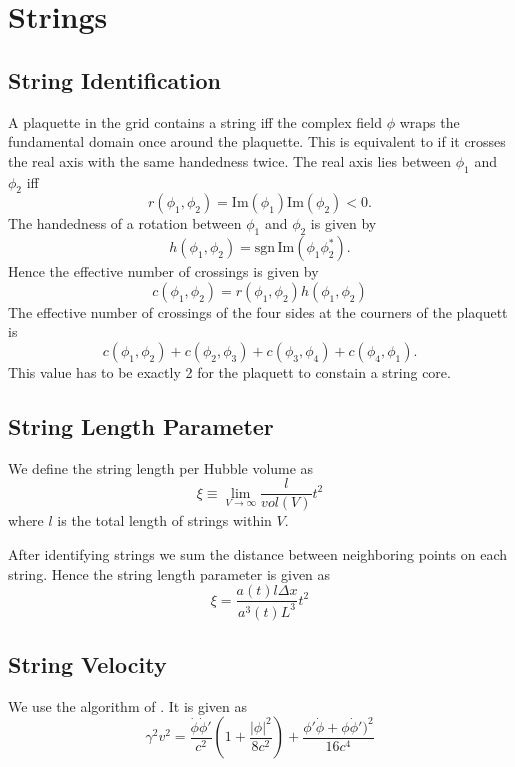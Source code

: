\documentclass[a4paper]{article}
\begin{document}
\newpage
\section{Strings}

\subsection{String Identification}
A plaquette in the grid contains a string iff the complex field $\phi$ wraps the fundamental domain once around the plaquette.
This is equivalent to if it crosses the real axis with the same handedness twice.
The real axis lies between $\phi_1$ and $\phi_2$ iff
\begin{equation}
	r(\phi_1, \phi_2) = \mathrm{Im}(\phi_1) \mathrm{Im}(\phi_2) < 0.
\end{equation} 
The handedness of a rotation between $\phi_1$ and $\phi_2$ is given by
\begin{equation}
	h(\phi_1, \phi_2) = \mathrm{sgn} \, \mathrm{Im} (\phi_1 \phi_2^*).
\end{equation}
Hence the effective number of crossings is given by
\begin{equation}
	c(\phi_1, \phi_2) = r(\phi_1, \phi_2) h(\phi_1, \phi_2)
\end{equation}
The effective number of crossings of the four sides at the courners of the plaquett is
\begin{equation}
	c(\phi_1, \phi_2) + c(\phi_2, \phi_3) + c(\phi_3, \phi_4) + c(\phi_4, \phi_1).
\end{equation}
This value has to be exactly 2 for the plaquett to constain a string core.

\subsection{String Length Parameter}
We define the string length per Hubble volume as
\begin{equation}
    \xi \equiv \lim_{V \to \infty} \frac{l}{vol(V)} t^2
\end{equation}
where $l$ is the total length of strings within $V$.

After identifying strings we sum the distance between neighboring points on each string. Hence the string length parameter is given as 
\begin{equation}
	\xi = \frac{a(t) l \Delta x}{a^3(t) L^3} t^2
\end{equation}

\subsection{String Velocity}
We use the algorithm of \cite[appendix A.2, eq. A.10]{axion_dark_matter_strings_and_their_cores}.
It is given as
\begin{equation}
	\gamma^2 v^2 = \frac{\dot{\phi} \dot{\phi}'}{c^2} \left(1 + \frac{|\phi|^2}{8 c^2} \right) + \frac{\phi' \dot{\phi} + \phi \dot{\phi}')^2}{16 c^4}
\end{equation}
 
\end{document}
